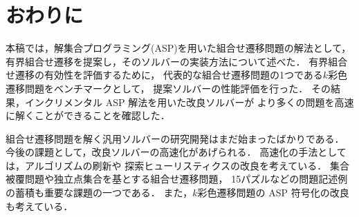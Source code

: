 ﻿%
\section{おわりに}\label{chap:conclusion}

本稿では，解集合プログラミング(ASP)を用いた組合せ遷移問題の解法として，
有界組合せ遷移を提案し，そのソルバーの実装方法について述べた．
有界組合せ遷移の有効性を評価するために，
代表的な組合せ遷移問題の1つである$k$彩色遷移問題をベンチマークとして，
提案ソルバーの性能評価を行った．
その結果，インクリメンタル ASP 解法を用いた改良ソルバーが
より多くの問題を高速に解くことができることを確認した．

組合せ遷移問題を解く汎用ソルバーの研究開発はまだ始まったばかりである．
今後の課題として，改良ソルバーの高速化があげられる．
高速化の手法としては，アルゴリズムの刷新や
探索ヒューリスティクスの改良を考えている．
%
集合被覆問題や独立点集合を基とする組合せ遷移問題，
15パズルなどの問題記述例の蓄積も重要な課題の一つである．
また，$k$彩色遷移問題の ASP 符号化の改良も考えている．


%


